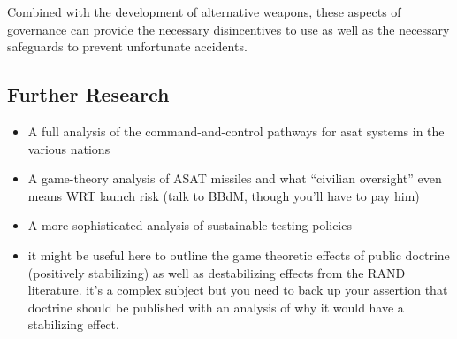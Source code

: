 Combined with the development of alternative weapons, these aspects of
governance can provide the necessary disincentives to use as well as
the necessary safeguards to prevent unfortunate accidents.

\subsection{Further Research}

\begin{itemize}

\item A full analysis of the command-and-control pathways for asat
  systems in the various nations

\item A game-theory analysis of ASAT missiles and what ``civilian
  oversight'' even means WRT launch risk (talk to BBdM, though you'll
  have to pay him)

\item A more sophisticated analysis of sustainable testing policies

\item it might be useful here to outline the game theoretic effects of
  public doctrine (positively stabilizing) as well as destabilizing
  effects from the RAND literature. it's a complex subject but you
  need to back up your assertion that doctrine should be published
  with an analysis of why it would have a stabilizing effect.

\end{itemize}

